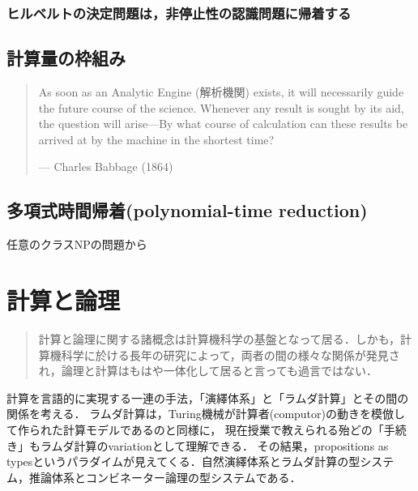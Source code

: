 \documentclass[uplatex, dvipdfmx]{jsreport}
\begin{document}
\subsection{ヒルベルトの決定問題は，非停止性の認識問題に帰着する\cite{Turing-OnComputableNumbers}}

\section{計算量の枠組み}
\begin{quotation}
    As soon as an Analytic Engine (解析機関) exists, it will necessarily guide the future course of the science. Whenever any result is sought by its aid, the question will arise—By what course of calculation can these results be arrived at by the machine in the shortest time?
    
    \begin{flushright}
        — Charles Babbage (1864)
    \end{flushright}
\end{quotation}

\section{多項式時間帰着(polynomial-time reduction)}

\begin{definition}
    
\end{definition}

\begin{definition}
    任意のクラスNPの問題から
\end{definition}

\chapter{計算と論理}

\begin{quotation}
    計算と論理に関する諸概念は計算機科学の基盤となって居る．しかも，計算機科学に於ける長年の研究によって，両者の間の様々な関係が発見され，論理と計算はもはや一体化して居ると言っても過言ではない．
\end{quotation}

計算を言語的に実現する一連の手法，「演繹体系」と「ラムダ計算」とその間の関係を考える．
ラムダ計算は，Turing機械が計算者(computor)の動きを模倣して作られた計算モデルであるのと同様に，
現在授業で教えられる殆どの「手続き」もラムダ計算のvariationとして理解できる．
その結果，propositions as typesというパラダイムが見えてくる．自然演繹体系とラムダ計算の型システム，推論体系とコンビネーター論理の型システムである．
\end{document}
